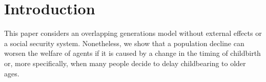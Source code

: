\documentclass[nogrid]{MBE}%
\begin{document}

\maketitle



\section{{Introduction}\label{sec:Intro}}


This paper considers an overlapping generations model without external effects or a social
security system. Nonetheless, we show that a population decline can worsen the welfare of agents
if it is caused by a change in the timing of childbirth or, more specifically, when many people
decide to delay childbearing to older ages.
\end{document}

